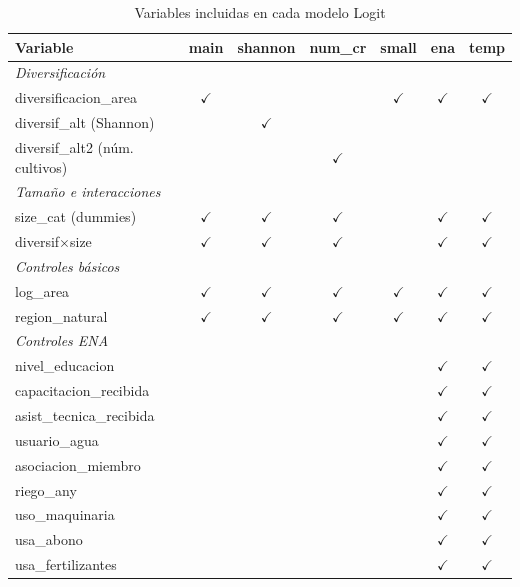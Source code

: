 \documentclass[11pt,a4paper]{article}
\begin{document}
\begin{table}[H]
\centering
\caption{Variables incluidas en cada modelo Logit}
\label{tab:logit_spec}
\begin{threeparttable}
\footnotesize
\begin{tabular}{p{4cm}cccccc}
\toprule
\textbf{Variable} & \textbf{main} & \textbf{shannon} & \textbf{num\_cr} & \textbf{small} & \textbf{ena} & \textbf{temp} \\
\midrule
\multicolumn{7}{l}{\textit{Diversificación}} \\
diversificacion\_area & $\checkmark$ & & & $\checkmark$ & $\checkmark$ & $\checkmark$ \\
diversif\_alt (Shannon) & & $\checkmark$ & & & & \\
diversif\_alt2 (núm. cultivos) & & & $\checkmark$ & & & \\
\midrule
\multicolumn{7}{l}{\textit{Tamaño e interacciones}} \\
size\_cat (dummies) & $\checkmark$ & $\checkmark$ & $\checkmark$ & & $\checkmark$ & $\checkmark$ \\
diversif$\times$size & $\checkmark$ & $\checkmark$ & $\checkmark$ & & $\checkmark$ & $\checkmark$ \\
\midrule
\multicolumn{7}{l}{\textit{Controles básicos}} \\
log\_area & $\checkmark$ & $\checkmark$ & $\checkmark$ & $\checkmark$ & $\checkmark$ & $\checkmark$ \\
region\_natural & $\checkmark$ & $\checkmark$ & $\checkmark$ & $\checkmark$ & $\checkmark$ & $\checkmark$ \\
\midrule
\multicolumn{7}{l}{\textit{Controles ENA}} \\
nivel\_educacion & & & & & $\checkmark$ & $\checkmark$ \\
capacitacion\_recibida & & & & & $\checkmark$ & $\checkmark$ \\
asist\_tecnica\_recibida & & & & & $\checkmark$ & $\checkmark$ \\
usuario\_agua & & & & & $\checkmark$ & $\checkmark$ \\
asociacion\_miembro & & & & & $\checkmark$ & $\checkmark$ \\
riego\_any & & & & & $\checkmark$ & $\checkmark$ \\
uso\_maquinaria & & & & & $\checkmark$ & $\checkmark$ \\
usa\_abono & & & & & $\checkmark$ & $\checkmark$ \\
usa\_fertilizantes & & & & & $\checkmark$ & $\checkmark$ \\

\end{tabular}
\end{threeparttable}
\end{table}
\end{document}
